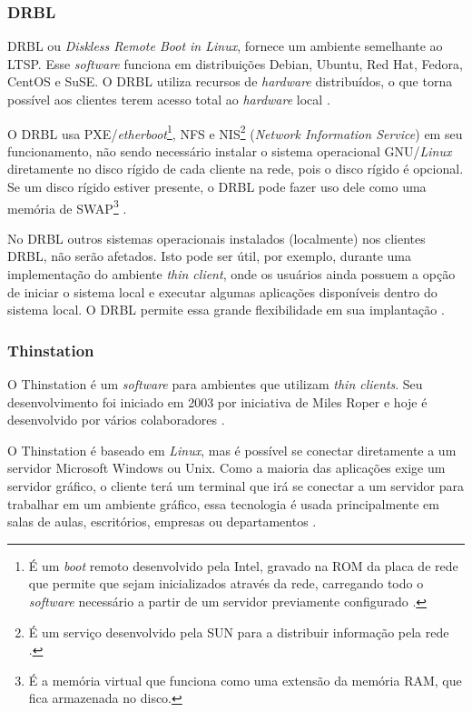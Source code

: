 \documentclass[
	12pt,				%
	openright,			%
	twoside,			%
	a4paper,			%
	chapter=TITLE,		%
	english,			%
	brazil				%
	]{abntex2}
\begin{document}
\subsubsection{DRBL}

DRBL ou \textit{Diskless Remote Boot in Linux}, fornece um ambiente semelhante ao LTSP. Esse \textit{software} funciona em distribuições Debian, Ubuntu, Red Hat, Fedora, CentOS e SuSE. O DRBL utiliza recursos de \textit{hardware} distribuídos, o que torna possível aos clientes terem acesso total ao \textit{hardware} local \cite{drbl}.

O DRBL usa PXE/\textit{etherboot}\footnote{É um \textit{boot} remoto desenvolvido pela Intel, gravado na ROM da placa de rede que permite que sejam inicializados através da rede, carregando todo o \textit{software} necessário a partir de um servidor previamente configurado \cite{pxe}.}, NFS e NIS\footnote{É um serviço desenvolvido pela SUN para a distribuir informação pela rede \cite{nis}.} (\textit{Network Information Service}) em seu funcionamento, não sendo necessário instalar o sistema operacional GNU/\textit{Linux} diretamente no disco rígido de cada cliente na rede, pois o disco rígido é opcional. Se um disco rígido estiver presente, o DRBL pode fazer uso dele como uma memória de SWAP\footnote{É a memória virtual que funciona como uma extensão da memória RAM, que fica armazenada no disco.} \cite{drbl,piaui,Frank.drbl}.

No DRBL outros sistemas operacionais instalados (localmente) nos clientes DRBL, não serão afetados. Isto pode ser útil, por exemplo, durante uma implementação do ambiente \textit{thin client}, onde os usuários ainda possuem a opção de iniciar o sistema local e executar algumas aplicações disponíveis dentro do sistema local. O DRBL permite essa grande flexibilidade em sua implantação \cite{drbl}.

\subsubsection{Thinstation}

O Thinstation é um \textit{software} para ambientes que utilizam \textit{thin clients}. Seu desenvolvimento foi iniciado em 2003 por iniciativa de Miles Roper e hoje é desenvolvido por vários colaboradores \cite{Thinstationl,piaui}.

O Thinstation é baseado em \textit{Linux}, mas é possível se conectar diretamente a um servidor Microsoft Windows ou Unix. Como a maioria das aplicações exige um servidor gráfico, o cliente terá um terminal que irá se conectar a um servidor para trabalhar em um ambiente gráfico, essa tecnologia é usada principalmente em salas de aulas, escritórios, empresas ou departamentos \cite{Thinstationl}.
\end{document}
